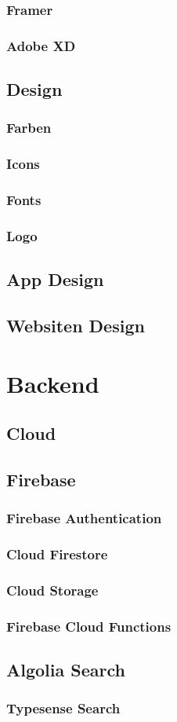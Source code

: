\subsubsection{Framer}
\subsubsection{Adobe XD}


\subsection{Design}
\subsubsection{Farben}
\subsubsection{Icons}
\subsubsection{Fonts}
\subsubsection{Logo}
\subsection{App Design}
\subsection{Websiten Design}

\section{Backend}
\subsection{Cloud}
\subsection{Firebase}
\subsubsection{Firebase Authentication}
\subsubsection{Cloud Firestore}
\subsubsection{Cloud Storage}
\subsubsection{Firebase Cloud Functions}
\subsection{Algolia Search}
\subsubsection{Typesense Search}
